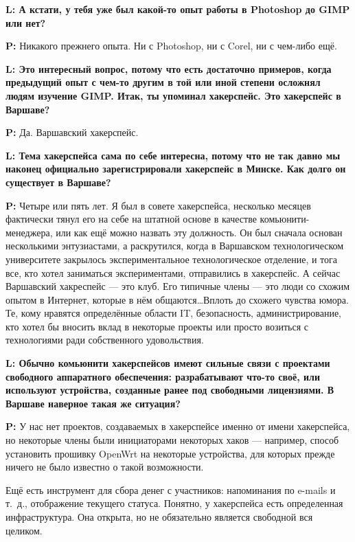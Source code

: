 \documentclass[10pt, a5paper]{article}
\begin{document}
\begin{Parallel}[p]{}{}
{{\noindent \bf L: А кстати, у тебя уже был какой-то опыт работы в \linebreak Photoshop до GIMP или нет?}

{\noindent \bf P:}  Никакого прежнего опыта. Ни с Photoshop, ни с Corel, ни с чем-либо ещё.

{\noindent \bf L: Это интересный вопрос, потому что есть достаточно примеров, когда предыдущий опыт с чем-то другим в той или иной степени осложнял людям изучение GIMP. Итак, ты упоминал хакерспейс. Это хакерспейс в Варшаве?}

{\noindent \bf P:} Да. Варшавский хакерспейс. 

{\noindent \bf L: Тема хакерспейса сама по себе интересна, потому что не так давно мы наконец официально зарегистрировали хакерспейс в Минске. Как долго он существует в Варшаве?}

{\noindent \bf P:} Четыре или пять лет. Я был в совете хакерспейса, несколько  месяцев фактически тянул его на себе на штатной основе в качестве комьюнити-менеджера, или как ещё можно назвать эту должность. Он был сначала основан несколькими энтузиастами, а раскрутился, когда в Варшавском технологическом университете закрылось экспериментальное технологическое отделение, и тога все, кто хотел заниматься экспериментами, отправились в хакерспейс. А сейчас Варшавский хакреспейс --- это клуб. Его типичные члены --- это люди со схожим опытом в Интернет, которые в нём общаются\ldots Вплоть до схожего чувства юмора. Те, кому нравятся определённые области IT, безопасность, администрирование, кто хотел бы вносить вклад в некоторые проекты или просто возиться с технологиями ради собственного удовольствия.

{\noindent \bf L: Обычно комьюнити хакерспейсов имеют сильные связи с проектами свободного аппаратного обеспечения: разрабатывают что-то своё, или используют устройства, созданные ранее под свободными лицензиями. В Варшаве наверное такая же ситуация?}

{\noindent \bf P:} У нас нет проектов, создаваемых в хакерспейсе именно от имени хакерспейса, но некоторые члены были инициаторами некоторых хаков --- например, способ установить прошивку OpenWrt на некоторые устройства, для которых прежде ничего не было известно о такой возможности.

Ещё есть инструмент для сбора денег с участников: напоминания по e-mails и т.~д., отображение текущего статуса. Понятно, у хакерспейса есть определенная инфраструктура. Она открыта, но не обязательно является свободной вся целиком. 
 
}
\end{Parallel}
\end{document}
